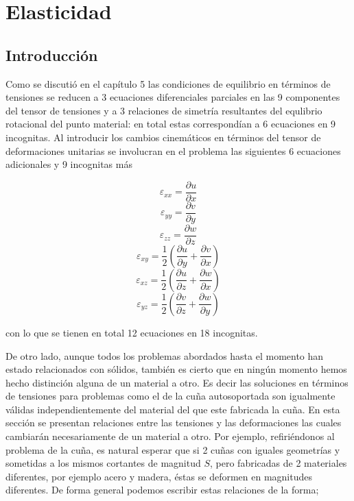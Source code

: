 \documentclass[../notas medios.tex]{subfiles}
\begin{document}
\chapter{Elasticidad}

\graphicspath{{img/Cap6/}} 								 %
\section{Introducción}
Como se discutió en el capítulo 5 las condiciones de equilibrio en términos de tensiones se reducen a 3 ecuaciones diferenciales parciales en las 9 componentes del tensor de tensiones y a 3 relaciones de simetría resultantes del equlibrio rotacional del punto material: en total estas correspondían a 6 ecuaciones en 9 incognitas. Al introducir los cambios cinemáticos en términos del tensor de deformaciones unitarias se involucran en el problema las siguientes 6 ecuaciones adicionales y 9 incognitas más


\[{\varepsilon _{xx}} = \frac{{\partial u}}{{\partial x}}\]
\[{\varepsilon _{yy}} = \frac{{\partial v}}{{\partial y}}\]
\[{\varepsilon _{zz}} = \frac{{\partial w}}{{\partial z}}\]
\[{\varepsilon _{xy}} = \frac{1}{2}\left( {\frac{{\partial u}}{{\partial y}} + \frac{{\partial v}}{{\partial x}}} \right)\]
\[{\varepsilon _{xz}} = \frac{1}{2}\left( {\frac{{\partial u}}{{\partial z}} + \frac{{\partial w}}{{\partial x}}} \right)\]
\[{\varepsilon _{yz}} = \frac{1}{2}\left( {\frac{{\partial v}}{{\partial z}} + \frac{{\partial w}}{{\partial y}}} \right)\]

con lo que se tienen en total 12 ecuaciones en 18 incognitas.

De otro lado, aunque todos los problemas abordados hasta el momento han estado relacionados con sólidos, también es cierto que en ningún momento hemos hecho distinción alguna de un material a otro. Es decir las soluciones en términos de tensiones para problemas como el de la cuña autosoportada son igualmente válidas independientemente del material del que este fabricada la cuña. En esta sección se presentan  relaciones entre las tensiones y las deformaciones las cuales cambiarán necesariamente de un material a otro. Por ejemplo, refiriéndonos al problema de la cuña, es natural esperar que si 2 cuñas con iguales geometrías y sometidas a los mismos cortantes de magnitud $S$, pero fabricadas de 2 materiales diferentes, por ejemplo acero y madera, éstas se deformen en magnitudes diferentes. De forma general podemos escribir estas relaciones de la forma;
\end{document}
